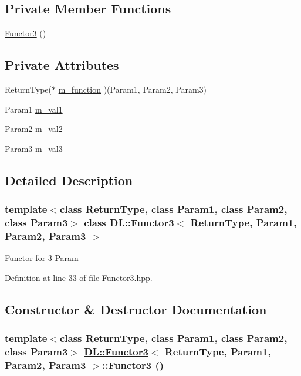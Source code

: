 \subsection*{Private Member Functions}
\begin{CompactItemize}
\item 
\hyperlink{classDL_1_1Functor3_d0}{Functor3} ()
\end{CompactItemize}
\subsection*{Private Attributes}
\begin{CompactItemize}
\item 
Return\-Type($\ast$ \hyperlink{classDL_1_1Functor3_r0}{m\_\-function} )(Param1, Param2, Param3)
\item 
Param1 \hyperlink{classDL_1_1Functor3_r1}{m\_\-val1}
\item 
Param2 \hyperlink{classDL_1_1Functor3_r2}{m\_\-val2}
\item 
Param3 \hyperlink{classDL_1_1Functor3_r3}{m\_\-val3}
\end{CompactItemize}


\subsection{Detailed Description}
\subsubsection*{template$<$class Return\-Type, class Param1, class Param2, class Param3$>$ class DL::Functor3$<$ Return\-Type, Param1, Param2, Param3 $>$}

Functor for 3 Param



Definition at line 33 of file Functor3.hpp.

\subsection{Constructor \& Destructor Documentation}
\hypertarget{classDL_1_1Functor3_d0}{
\subsubsection[Functor3]{\setlength{\rightskip}{0pt plus 5cm}template$<$class Return\-Type, class Param1, class Param2, class Param3$>$ \hyperlink{classDL_1_1Functor3}{DL::Functor3}$<$ Return\-Type, Param1, Param2, Param3 $>$::\hyperlink{classDL_1_1Functor3}{Functor3} ()}}
\label{classDL_1_1Functor3_d0}




